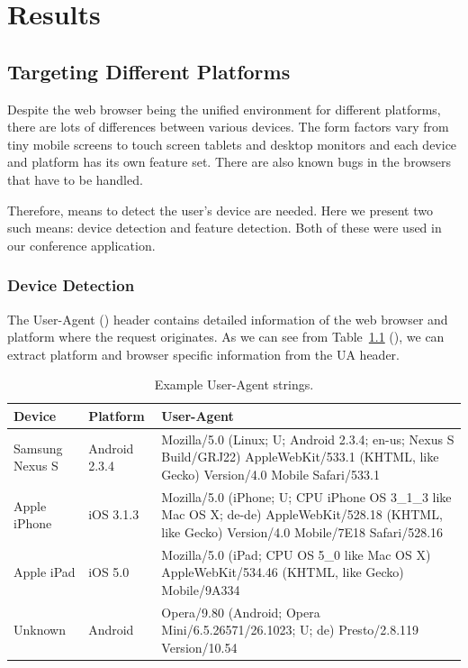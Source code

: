 \chapter{Results}
\label{chapter:results}

\section{Targeting Different Platforms}
\label{section:targeting-platforms}

Despite the web browser being the unified environment for different
platforms, there are lots of differences between various devices. The
form factors vary from tiny mobile screens to touch screen tablets and
desktop monitors and each device and platform has its own feature
set. There are also known bugs in the browsers that have to be
handled.

Therefore, means to detect the user's device are needed. Here we
present two such means: device detection and feature detection. Both
of these were used in our conference application.

\subsection{Device Detection}
\label{subsection:device-detection}

The User-Agent ()  header contains detailed
information of the web browser and platform where the request
originates. As we can see from Table~\ref{table:user-agents}
(), we can extract platform and browser
specific information from the UA header.

\begin{table}
  \begin{tabular}{ l | l | p{7cm} }
    \textbf{Device} & \textbf{Platform} & \textbf{User-Agent} \\ \hline
    Samsung Nexus S & Android 2.3.4 & Mozilla/5.0 (Linux; U; Android 2.3.4; en-us; Nexus S Build/GRJ22) AppleWebKit/533.1 (KHTML, like Gecko) Version/4.0 Mobile Safari/533.1 \\ \hline
    Apple iPhone & iOS 3.1.3 & Mozilla/5.0 (iPhone; U; CPU iPhone OS 3\_1\_3 like Mac OS X; de-de) AppleWebKit/528.18 (KHTML, like Gecko) Version/4.0 Mobile/7E18 Safari/528.16 \\ \hline
    Apple iPad & iOS 5.0 & Mozilla/5.0 (iPad; CPU OS 5\_0 like Mac OS X) AppleWebKit/534.46 (KHTML, like Gecko) Mobile/9A334 \\ \hline
    Unknown & Android & Opera/9.80 (Android; Opera Mini/6.5.26571/26.1023; U; de) Presto/2.8.119 Version/10.54 \\ \hline
  \end{tabular}
  \label{table:user-agents}
  \caption{Example User-Agent strings.}
\end{table}

